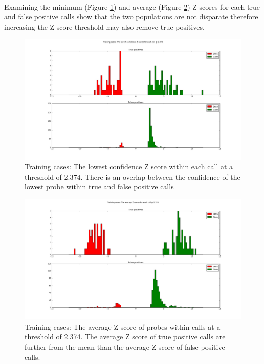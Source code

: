 \paragraph*{}
Examining the minimum (Figure \ref{fig:lowest_2_374}) and average (Figure \ref{fig:average_2_374}) Z scores for each true and false positive calls show that the two populations are not disparate therefore increasing the Z score threshold may also remove true positives. 
\begin{figure}[h]
\centering
\includegraphics[width=1\linewidth]{./Figures/lowest_2_374}
\caption[Training cases: The lowest confidence Z score within each call at a threshold of 2.374]{Training cases: The lowest confidence Z score within each call at a threshold of 2.374. There is an overlap between the confidence of the lowest probe within true and false positive calls}
\label{fig:lowest_2_374}
\end{figure}

\begin{figure}[h]
\centering
\includegraphics[width=1\linewidth]{./Figures/average_2_374}
\caption[Training cases: The average Z score of probes within calls at a threshold of 2.374]{Training cases: The average Z score of probes within calls at a threshold of 2.374. The average Z score of true positive calls are further from the mean than the average Z score of false positive calls.}
\label{fig:average_2_374}
\end{figure}

